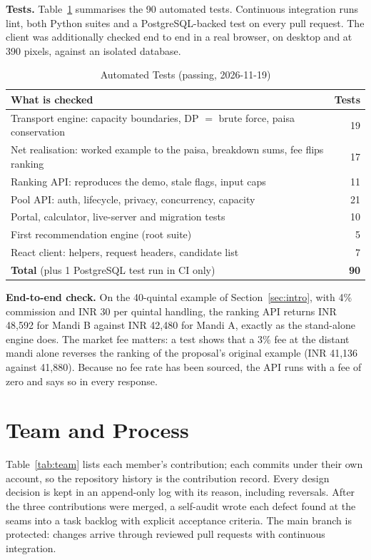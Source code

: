 \documentclass[conference]{IEEEtran}
\newcommand{\TestsRoot}{5}
\newcommand{\TestsFrontend}{7}
\newcommand{\TestsAll}{90}
\begin{document}
\textbf{Tests.} Table~\ref{tab:tests} summarises the \TestsAll{} automated
tests. Continuous integration runs lint, both Python suites and a
PostgreSQL-backed test on every pull request. The client was additionally
checked end to end in a real browser, on desktop and at 390 pixels,
against an isolated database.

\begin{table}[!t]
\caption{Automated Tests (passing, 2026-11-19)}
\label{tab:tests}
\centering
\scriptsize
\setlength{\tabcolsep}{3pt}
\begin{tabular}{>{\raggedright\arraybackslash}p{} r}
\toprule
\textbf{What is checked} & \textbf{Tests}\\
\midrule
Transport engine: capacity boundaries, DP $=$ brute force, paisa conservation & 19\\
Net realisation: worked example to the paisa, breakdown sums, fee flips ranking & 17\\
Ranking API: reproduces the demo, stale flags, input caps & 11\\
Pool API: auth, lifecycle, privacy, concurrency, capacity & 21\\
Portal, calculator, live-server and migration tests & 10\\
First recommendation engine (root suite) & \TestsRoot\\
React client: helpers, request headers, candidate list & \TestsFrontend\\
\midrule
\textbf{Total} (plus 1 PostgreSQL test run in CI only) & \textbf{\TestsAll}\\
\bottomrule
\end{tabular}
\end{table}

\textbf{End-to-end check.} On the 40-quintal example of
Section~\ref{sec:intro}, with 4\% commission and INR 30 per quintal
handling, the ranking API returns INR 48,592 for Mandi B against INR
42,480 for Mandi A, exactly as the stand-alone engine does. The market fee
matters: a test shows that a 3\% fee at the distant mandi alone reverses
the ranking of the proposal's original example (INR 41,136 against
41,880). Because no fee rate has been sourced, the API runs with a fee of
zero and says so in every response.

\section{Team and Process}
\label{sec:team}
Table~\ref{tab:team} lists each member's contribution; each commits under
their own account, so the repository history is the contribution record.
Every design decision is kept in an append-only log with its reason,
including reversals. After the three contributions were merged, a
self-audit wrote each defect found at the seams into a task backlog with
explicit acceptance criteria. The main branch is protected: changes arrive
through reviewed pull requests with continuous integration.
\end{document}
